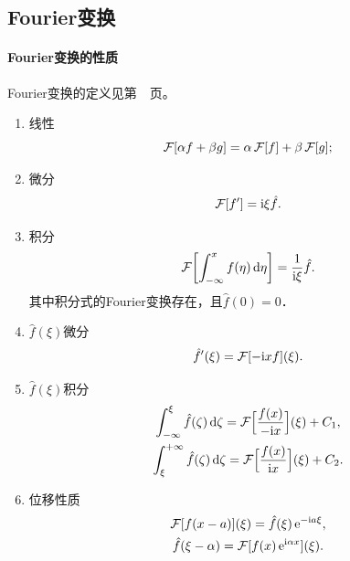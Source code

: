 \subsection{Fourier变换}

\paragraph{Fourier变换的性质}
\label{The Property of Fourier Transformation}
Fourier变换的定义见第~\pageref{dfn:Integral Transformation}~页。

\begin{enumerate}
	\item 线性
		\begin{equation}
			\label{eq:mmp-fourier-linearity}
			\operatorname{\mathcal{F}}[\alpha f + \beta g] = \alpha\operatorname{\mathcal{F}}[f] + \beta\operatorname{\mathcal{F}}[g];
		\end{equation}
	\item 微分
		\begin{equation}
			\label{eq:mmp-fourier-derivative}
			\operatorname{\mathcal{F}}[f'] = \mathrm{i}\xi\hat f.
		\end{equation}
	\item 积分
		\begin{equation}
			\label{eq:mmp-fourier-primitive}
			\operatorname{\mathcal{F}}\biggl[\int_{-\infty}^xf(\eta)\mathop{}\!\mathrm{d}\eta\biggr] = \frac1{\mathrm{i}\xi}\hat f.
		\end{equation}
		其中积分式的Fourier变换存在，且$\hat f(0) = 0$．
	\item $\hat f(\xi)$微分
		\begin{equation}
			\label{eq:mmp-fourier-frequency-derivative}
			\hat f'(\xi) = \operatorname{\mathcal{F}}[-\mathrm{i} xf](\xi).
		\end{equation}
	\item $\hat f(\xi)$积分
			\begin{gather}
				\int_{-\infty}^\xi\hat f(\zeta)\mathop{}\!\mathrm{d}\zeta = \operatorname{\mathcal{F}}\Bigl[\frac{f(x)}{-\mathrm{i} x}\Bigr](\xi) + C_1,\\
				\int_\xi^{+\infty}\hat f(\zeta)\mathop{}\!\mathrm{d}\zeta = \operatorname{\mathcal{F}}\Bigl[\frac{f(x)}{\mathrm{i} x}\Bigr](\xi) + C_2.
			\end{gather}
	\item 位移性质
			\begin{subequations}
				\label{eq:mmp-fourier-shift}
				\begin{gather}
					\operatorname{\mathcal{F}}[f(x - a)](\xi) = \hat f(\xi)\mathop{}\!\mathrm{e}^{-\mathrm{i} a\xi},\\
					\hat f(\xi - \alpha) = \operatorname{\mathcal{F}}[f(x)\mathop{}\!\mathrm{e}^{\mathrm{i}\alpha x}](\xi).
				\end{gather}

\end{subequations}
\end{enumerate}
